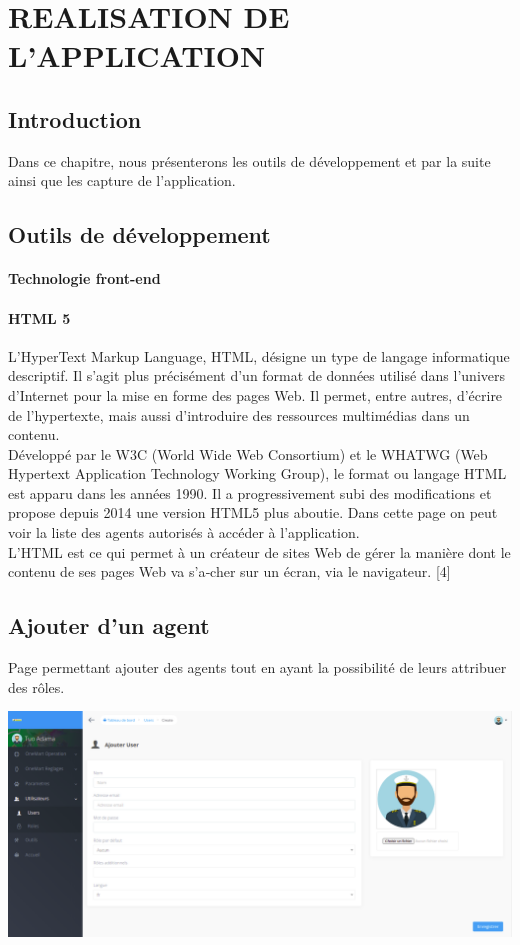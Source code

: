 \chapter{REALISATION DE L’APPLICATION}
	\section{Introduction}
		Dans ce chapitre, nous présenterons les outils de développement et par la suite ainsi que les capture de l’application.
	\section{Outils de développement}
		\subsubsection{Technologie front-end }
		\subsubsection{HTML 5}
		 L'HyperText Markup Language, HTML, désigne un type de langage informatique descriptif. Il s'agit plus précisément d'un format de données utilisé dans l'univers d'Internet pour la mise en forme des pages Web. Il permet, entre autres, d'écrire de l'hypertexte, mais aussi d'introduire des ressources multimédias dans un contenu.\\
		 
		 Développé par le W3C (World Wide Web Consortium) et le WHATWG (Web Hypertext Application Technology Working Group), le format ou langage HTML est apparu dans les années 1990. Il a progressivement subi des modifications et propose depuis 2014 une version HTML5 plus aboutie.
		Dans cette page on peut voir la liste des agents autorisés à accéder à l'application.\\
		
		L'HTML est ce qui permet à un créateur de sites Web de gérer la manière dont le contenu de ses pages Web va s'a‑cher sur un écran, via le navigateur. [4]\\
		
		
		
	\section{Ajouter d'un agent}
		Page permettant ajouter des agents tout en ayant la possibilité de leurs attribuer des rôles.
		\begin{center}
			\includegraphics[scale=0.4]{chap_3/ajouter_agent.png}
			\label{ajouter_agents}
		\end{center}
